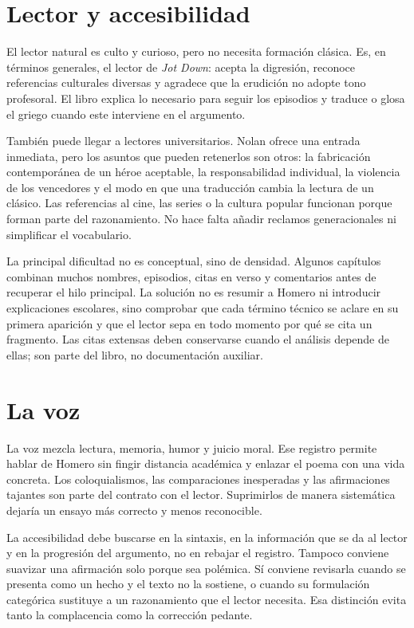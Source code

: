\documentclass[12pt,a4paper]{article}
\begin{document}
\section*{Lector y accesibilidad}

El lector natural es culto y curioso, pero no necesita formación clásica. Es, en términos generales, el lector de \emph{Jot Down}: acepta la digresión, reconoce referencias culturales diversas y agradece que la erudición no adopte tono profesoral. El libro explica lo necesario para seguir los episodios y traduce o glosa el griego cuando este interviene en el argumento.

También puede llegar a lectores universitarios. Nolan ofrece una entrada inmediata, pero los asuntos que pueden retenerlos son otros: la fabricación contemporánea de un héroe aceptable, la responsabilidad individual, la violencia de los vencedores y el modo en que una traducción cambia la lectura de un clásico. Las referencias al cine, las series o la cultura popular funcionan porque forman parte del razonamiento. No hace falta añadir reclamos generacionales ni simplificar el vocabulario.

La principal dificultad no es conceptual, sino de densidad. Algunos capítulos combinan muchos nombres, episodios, citas en verso y comentarios antes de recuperar el hilo principal. La solución no es resumir a Homero ni introducir explicaciones escolares, sino comprobar que cada término técnico se aclare en su primera aparición y que el lector sepa en todo momento por qué se cita un fragmento. Las citas extensas deben conservarse cuando el análisis depende de ellas; son parte del libro, no documentación auxiliar.

\section*{La voz}

La voz mezcla lectura, memoria, humor y juicio moral. Ese registro permite hablar de Homero sin fingir distancia académica y enlazar el poema con una vida concreta. Los coloquialismos, las comparaciones inesperadas y las afirmaciones tajantes son parte del contrato con el lector. Suprimirlos de manera sistemática dejaría un ensayo más correcto y menos reconocible.

La accesibilidad debe buscarse en la sintaxis, en la información que se da al lector y en la progresión del argumento, no en rebajar el registro. Tampoco conviene suavizar una afirmación solo porque sea polémica. Sí conviene revisarla cuando se presenta como un hecho y el texto no la sostiene, o cuando su formulación categórica sustituye a un razonamiento que el lector necesita. Esa distinción evita tanto la complacencia como la corrección pedante.
\end{document}
